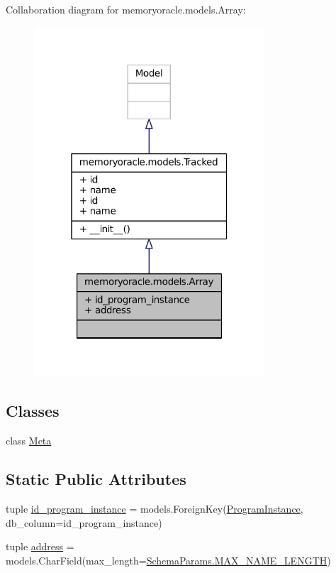 Collaboration diagram for memoryoracle.\+models.\+Array\+:
\nopagebreak
\begin{figure}[H]
\begin{center}
\leavevmode
\includegraphics[width=244pt]{classmemoryoracle_1_1models_1_1Array__coll__graph}
\end{center}
\end{figure}
\subsection*{Classes}
\begin{DoxyCompactItemize}
\item 
class \hyperlink{classmemoryoracle_1_1models_1_1Array_1_1Meta}{Meta}
\end{DoxyCompactItemize}
\subsection*{Static Public Attributes}
\begin{DoxyCompactItemize}
\item 
tuple \hyperlink{classmemoryoracle_1_1models_1_1Array_a8ca5f4283ab3e46c1c925f366b34d866}{id\+\_\+program\+\_\+instance} = models.\+Foreign\+Key(\textquotesingle{}\hyperlink{classmemoryoracle_1_1models_1_1ProgramInstance}{Program\+Instance}\textquotesingle{}, db\+\_\+column=\textquotesingle{}id\+\_\+program\+\_\+instance\textquotesingle{})
\item 
tuple \hyperlink{classmemoryoracle_1_1models_1_1Array_a15a3a1dd2f6586f9844fa4107f3c64c8}{address} = models.\+Char\+Field(max\+\_\+length=\hyperlink{classmemoryoracle_1_1models_1_1SchemaParams_ac1b9944d07a621af87e9fa7a812101aa}{Schema\+Params.\+M\+A\+X\+\_\+\+N\+A\+M\+E\+\_\+\+L\+E\+N\+G\+T\+H})
\end{DoxyCompactItemize}
